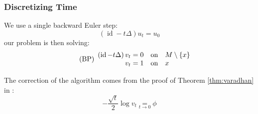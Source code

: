 \documentclass{beamercours}
\DeclareMathOperator{\id}{\mathrm{id}}
\begin{document}
\begin{frame}[allowframebreaks]
	\frametitle{Discretizing Time}
	We use a single backward Euler step:
	\begin{equation}
		\left( \id - t\Delta \right)u_{t} = u_{0}
	\end{equation}
	our problem is then solving:
	\begin{equation}
	\tag{BP}
	\begin{array}{rcl}
		\left( \id - t\Delta \right)v_{t} = 0 & \rm on & M\setminus \{x\}\\
		v_{t} = 1 & \rm on & x
	\end{array}
	\label{boundaryproblem}
	\end{equation}
	\framebreak

	The correction of the algorithm comes from the proof of Theorem \ref{thm:varadhan} in \cite{varadhan}:
	\begin{equation}
		\tag{$\delta t$}
		-\frac{\sqrt{t}}{2}\log v_{t} \underset{t \to 0}{=} \phi
		\label{discretetime}
	\end{equation}
\end{frame}
\end{document}
